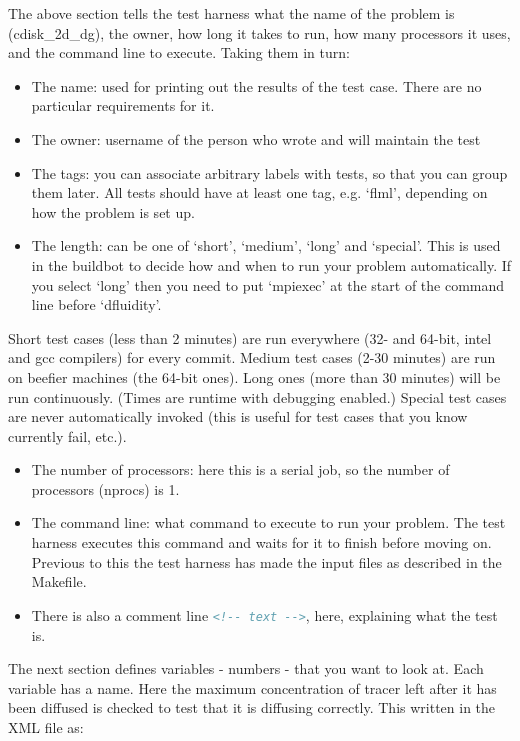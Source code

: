 The above section tells the test harness what the name of the problem is (cdisk\_2d\_dg), the owner, how long it takes to run, how many processors it uses, and the command line to execute. Taking them in turn:
\begin{itemize}
\item The name: used for printing out the results of the test case. There are no particular requirements for it.
\item The owner: username of the person who wrote and will maintain the test
\item The tags: you can associate arbitrary labels with tests, so that you can group them later. All tests should have at least one tag, e.g. `flml', depending on how the problem is set up.
\item The length: can be one of `short', `medium', `long' and `special'. This is used in the buildbot to decide how and when to run your problem automatically. If you select `long' then you need to put `mpiexec' at the start of the command line before `dfluidity'. 
\end{itemize} 

Short test cases (less than 2 minutes) are run everywhere (32- and 64-bit, intel and gcc compilers) for every commit. Medium test cases (2-30 minutes) are run on beefier machines (the 64-bit ones). Long ones (more than 30 minutes) will be run continuously. (Times are runtime with debugging enabled.) Special test cases are never automatically invoked (this is useful for test cases that you know currently fail, etc.). 

\begin{itemize}
\item The number of processors: here this is a serial job, so the number of processors (nprocs) is 1.
\item The command line: what command to execute to run your problem. The test harness executes this command and waits for it to finish before moving on. Previous to this the test harness has made the input files as described in the Makefile.  
\item There is also a comment line \lstinline[language=xml]+<!-- text -->+, here, explaining what the test is.
\end{itemize}

The next section defines variables - numbers - that you want to look at. Each variable has a name. Here the maximum concentration of tracer left after it has been diffused is checked to test that it is diffusing correctly. This written in the XML file as:

